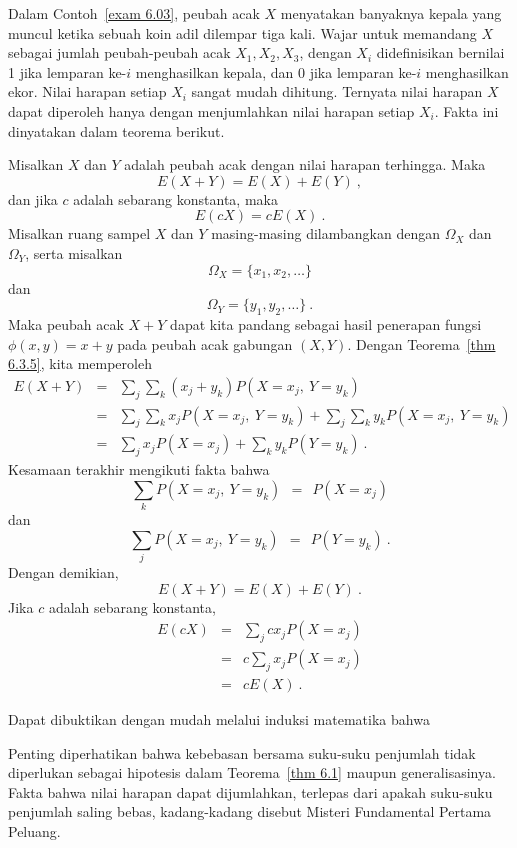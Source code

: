 Dalam Contoh~\ref{exam 6.03}, peubah acak $X$ menyatakan banyaknya kepala yang muncul
ketika sebuah koin adil dilempar tiga kali. Wajar untuk memandang $X$ sebagai jumlah
peubah-peubah acak $X_1, X_2, X_3$, dengan $X_i$ didefinisikan bernilai 1 jika
lemparan ke-$i$ menghasilkan kepala, dan 0 jika lemparan ke-$i$ menghasilkan ekor.
Nilai harapan setiap $X_i$ sangat mudah dihitung. Ternyata nilai harapan $X$ dapat
diperoleh hanya dengan menjumlahkan nilai harapan setiap $X_i$. Fakta ini dinyatakan
dalam teorema berikut.

\begin{theorem}\label{thm 6.1} Misalkan $X$ dan $Y$ adalah peubah acak dengan nilai
harapan terhingga. Maka
$$ E(X + Y) = E(X) + E(Y)\ ,
$$ dan jika $c$ adalah sebarang konstanta, maka
$$ E(cX) = cE(X)\ .
$$
\proof Misalkan ruang sampel $X$ dan $Y$ masing-masing dilambangkan dengan $\Omega_X$
dan $\Omega_Y$, serta misalkan
$$\Omega_X = \{x_1, x_2, \ldots\}$$ dan
$$\Omega_Y = \{y_1, y_2, \ldots\}\ .$$ Maka peubah acak $X + Y$ dapat kita pandang
sebagai hasil penerapan fungsi $\phi(x, y) = x + y$ pada peubah acak gabungan
$(X,Y)$. Dengan Teorema~\ref{thm 6.3.5}, kita memperoleh
\begin{eqnarray*} E(X+Y) & = &\sum_j \sum_k (x_j + y_k) P(X = x_j,\ Y = y_k) \\
       & = &\sum_j \sum_k x_j P(X = x_j,\ Y = y_k) +
\sum_j \sum_k y_k P(X = x_j,\ Y = y_k) \\ & = &\sum_j x_j P(X = x_j) + \sum_k y_k P(Y
= y_k)\ .
\end{eqnarray*} Kesamaan terakhir mengikuti fakta bahwa
$$\sum_k P(X = x_j,\ Y = y_k)\ \  =\ \  P(X = x_j)$$ dan
$$\sum_j P(X = x_j,\ Y = y_k)\ \  =\ \  P(Y = y_k)\ .$$ Dengan demikian,
$$E(X+Y) = E(X) + E(Y)\ .$$ Jika $c$ adalah sebarang konstanta,
\begin{eqnarray*}  E(cX) & = & \sum_j cx_j P(X = x_j) \\
      & = & c\sum_j x_j P(X = x_j)\\
      & = & cE(X)\ .
\end{eqnarray*}
\end{theorem}
Dapat dibuktikan dengan mudah melalui induksi matematika bahwa 
\par Penting diperhatikan bahwa kebebasan bersama suku-suku penjumlah tidak diperlukan
sebagai hipotesis dalam Teorema~\ref{thm 6.1} maupun generalisasinya. Fakta bahwa nilai
harapan dapat dijumlahkan, terlepas dari apakah suku-suku penjumlah saling bebas,
kadang-kadang disebut Misteri Fundamental Pertama Peluang.

